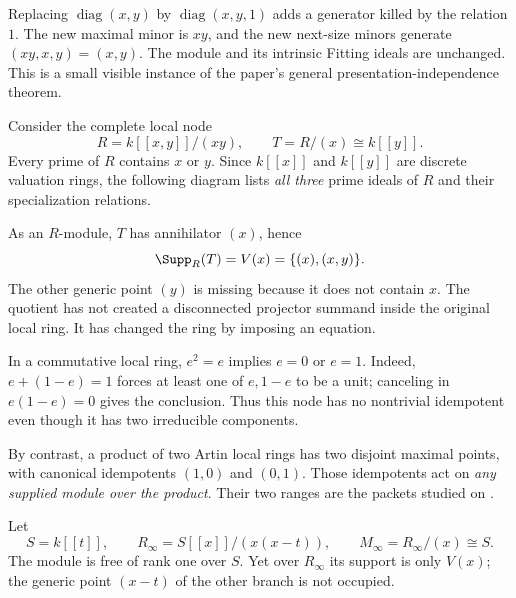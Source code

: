 Replacing $\operatorname{diag}(x,y)$ by $\operatorname{diag}(x,y,1)$ adds a generator killed by the relation $1$. The new maximal minor is $xy$, and the new next-size minors generate $(xy,x,y)=(x,y)$. The module and its intrinsic Fitting ideals are unchanged. This is a small visible instance of the paper's general presentation-independence theorem.


Consider the complete local node
\[
R=k[[x,y]]/(xy),\qquad T=R/(x)\cong k[[y]].
\]
Every prime of $R$ contains $x$ or $y$. Since $k[[x]]$ and $k[[y]]$ are discrete valuation rings, the following diagram lists \emph{all three} prime ideals of $R$ and their specialization relations.


As an $R$-module, $T$ has annihilator $(x)$, hence
\[
\Supp_R(T)=V(x)=\{(x),(x,y)\}.
\]
The other generic point $(y)$ is missing because it does not contain $x$. The quotient has not created a disconnected projector summand inside the original local ring. It has changed the ring by imposing an equation.

In a commutative local ring, $e^2=e$ implies $e=0$ or $e=1$. Indeed, $e+(1-e)=1$ forces at least one of $e,1-e$ to be a unit; canceling in $e(1-e)=0$ gives the conclusion. Thus this node has no nontrivial idempotent even though it has two irreducible components.

By contrast, a product of two Artin local rings has two disjoint maximal points, with canonical idempotents $(1,0)$ and $(0,1)$. Those idempotents act on \emph{any supplied module over the product}. Their two ranges are the packets studied on .


Let
\[
S=k[[t]],\qquad R_\infty=S[[x]]/(x(x-t)),\qquad
M_\infty=R_\infty/(x)\cong S.
\]
The module is free of rank one over $S$. Yet over $R_\infty$ its support is only $V(x)$; the generic point $(x-t)$ of the other branch is not occupied.

